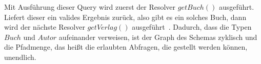 Mit Ausführung dieser Query wird zuerst der Resolver $getBuch()$ ausgeführt.
Liefert dieser ein valides Ergebnis zurück, also gibt es ein solches Buch, dann wird der nächste Resolver $getVerlag()$ ausgeführt~\cite[vgl. Resolver]{graphqlgraphtheory}.
Dadurch, dass die Typen $Buch$ und $Autor$ aufeinander verweisen, ist der Graph des Schemas zyklisch und die Pfadmenge,
das heißt die erlaubten Abfragen, die gestellt werden können, unendlich.

